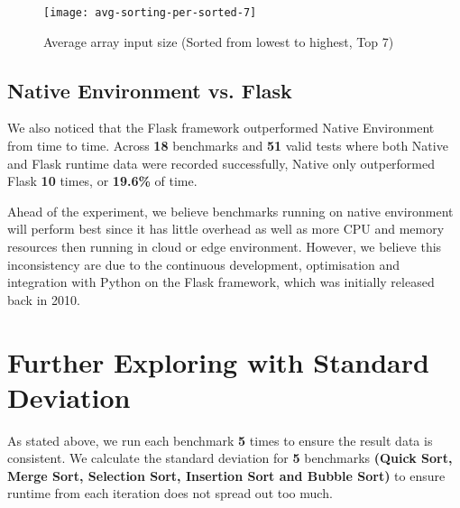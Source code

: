 \bigskip
\begin{figure}[hp]
\centering
\texttt{[image: avg-sorting-per-sorted-7]}
\caption{\footnotesize{Average array input size (Sorted from lowest to highest, Top 7)}}
\captionsetup{aboveskip=0pt,font=it}
\end{figure}
\bigskip

\subsection{Native Environment vs. Flask}

We also noticed that the Flask framework outperformed Native Environment from time to time. Across \textbf{18} benchmarks and \textbf{51} valid tests where both Native and Flask runtime data were recorded successfully, Native only outperformed Flask \textbf{10} times, or \textbf{19.6\%} of time.

Ahead of the experiment, we believe benchmarks running on native environment will perform best since it has little overhead as well as more CPU and memory resources then running in cloud or edge environment. However, we believe this inconsistency are due to the continuous development, optimisation and integration with Python on the Flask framework, which was initially released back in 2010.

\bigskip
\section{Further Exploring with Standard Deviation}

As stated above, we run each benchmark \textbf{5} times to ensure the result data is consistent. We calculate the standard deviation for \textbf{5} benchmarks \textbf{(Quick Sort, Merge Sort, Selection Sort, Insertion Sort and Bubble Sort)} to ensure runtime from each iteration does not spread out too much.

